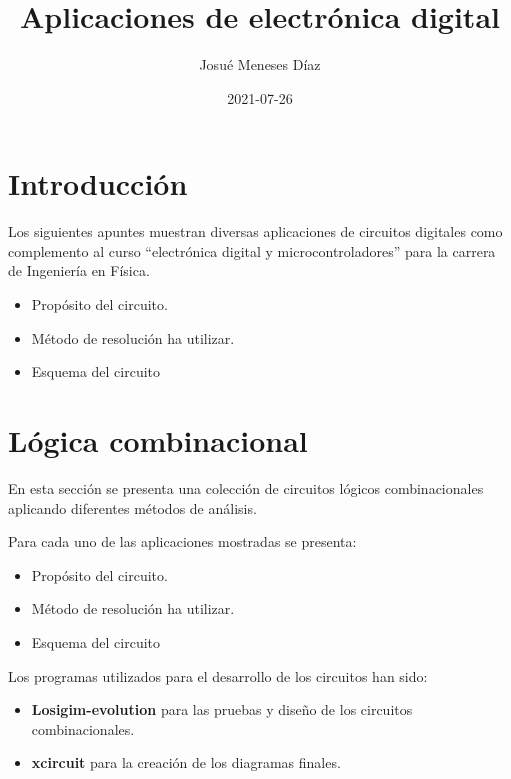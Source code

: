\documentclass[
]{book}
\title{Aplicaciones de electrónica digital}
\author{Josué Meneses Díaz}
\date{2021-07-26}
\providecommand{\tightlist}{%
  \setlength{\itemsep}{0pt}\setlength{\parskip}{0pt}}
\begin{document}
\maketitle

{
\setcounter{tocdepth}{1}
\tableofcontents
}
\listoftables
\listoffigures
\hypertarget{introducciuxf3n}{%
\chapter{Introducción}\label{introducciuxf3n}}

Los siguientes apuntes muestran diversas aplicaciones de circuitos digitales como complemento al curso ``electrónica digital y microcontroladores'' para la carrera de Ingeniería en Física.

\begin{itemize}
\tightlist
\item
  Propósito del circuito.
\item
  Método de resolución ha utilizar.
\item
  Esquema del circuito
\end{itemize}

\hypertarget{intro}{%
\chapter{Lógica combinacional}\label{intro}}

En esta sección se presenta una colección de circuitos lógicos combinacionales aplicando diferentes métodos de análisis.

Para cada uno de las aplicaciones mostradas se presenta:

\begin{itemize}
\tightlist
\item
  Propósito del circuito.
\item
  Método de resolución ha utilizar.
\item
  Esquema del circuito
\end{itemize}

Los programas utilizados para el desarrollo de los circuitos han sido:

\begin{itemize}
\tightlist
\item
  \textbf{Losigim-evolution} para las pruebas y diseño de los circuitos combinacionales.
\item
  \textbf{xcircuit} para la creación de los diagramas finales.
\end{itemize}
\end{document}
